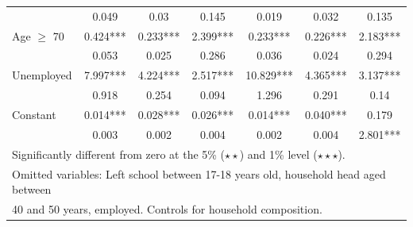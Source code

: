 \begin{table}
\begin{tabular}{l|ccc|ccc}
                    	&	       0.049   	&	0.03	&	0.145	&	       0.019   	&	0.032	&	0.135	\\				
Age $\geq$ 70	&	       0.424***	&	       0.233***	&	       2.399***	&	       0.233***	&	       0.226***	&	       2.183***	\\				
                    	&	       0.053   	&	0.025	&	0.286	&	       0.036   	&	0.024	&	0.294	\\				
Unemployed	&	       7.997***	&	       4.224***	&	       2.517***	&	      10.829***	&	       4.365***	&	       3.137***	\\				
	&	       0.918   	&	0.254	&	0.094	&	       1.296   	&	0.291	&	0.14	\\				
Constant            	&	       0.014***	&	       0.028***	&	       0.026***	&	       0.014***	&	       0.040***	&	0.179	\\				
                    	&	       0.003   	&	0.002	&	0.004	&	       0.002   	&	0.004	&	       2.801***	\\
\hline\hline
\multicolumn{7}{l}{Significantly different from zero at the 5\% ($\star\star$) and 1\% level ($\star\star\star$).} \\
\multicolumn{7}{l}{Omitted variables: Left school between 17-18 years old, household head aged between} \\
\multicolumn{7}{l}{40 and 50 years, employed. Controls for household composition.}
\end{tabular}
\end{table}

